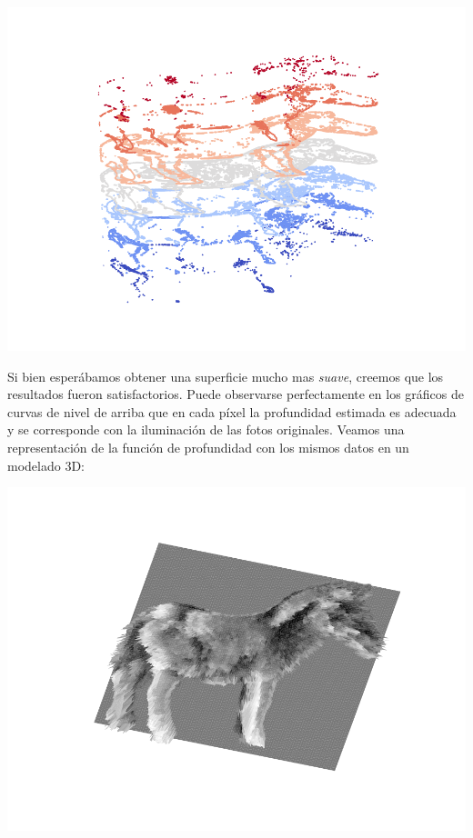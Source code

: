 {\centering
    \includegraphics[scale=0.6]{informe/imagenes/supnivel/supNivelCaballoLucesPropias578N3.pdf}
}

\newpage
Si bien esperábamos obtener una superficie mucho mas \textit{suave}, creemos que los resultados fueron satisfactorios. Puede observarse perfectamente en los gráficos de curvas de nivel de arriba que en cada píxel la profundidad estimada es adecuada y se corresponde con la iluminación de las fotos originales. Veamos una representación de la función de profundidad con los mismos datos en un modelado 3D:

{\centering
    \includegraphics[scale=0.8]{informe/imagenes/profundidades/profundidadesCaballoLucesPropias578.pdf} \\
}

